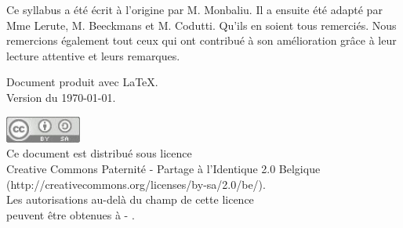 \clearpage
\thispagestyle{empty}

\vfill

Ce syllabus a été écrit à l'origine par M. Monbaliu.
Il a ensuite été adapté par Mme Lerute, M. Beeckmans et M. Codutti.
Qu'ils en soient tous remerciés.
Nous remercions également tout ceux qui ont contribué à son amélioration
grâce à leur lecture attentive et leurs remarques. 

\bigskip
Document produit avec \LaTeX.
\\Version du \today.

\vfill
\vfill

\includegraphics[width=25mm]{image/cc-gris}
\\
Ce document est distribué sous licence 
\\Creative Commons Paternité - Partage à l'Identique 2.0 Belgique 
\\(http://creativecommons.org/licenses/by-sa/2.0/be/).
\\Les autorisations au-delà du champ de cette licence
\\peuvent être obtenues à \entitesite{} - \texttt{\contact}.
\pagestyle{fancy}

\setcounter{tocdepth}{1}
\tableofcontents{}


